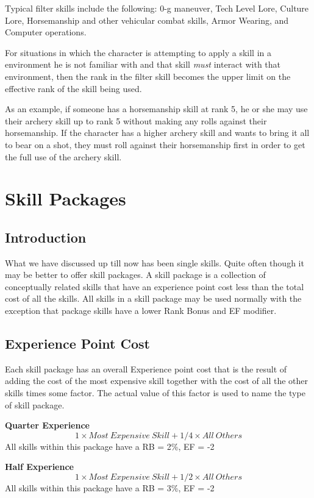 Typical filter skills include the following: 0-g maneuver, Tech 
Level Lore, Culture Lore, Horsemanship and other vehicular combat 
skills, Armor Wearing, and Computer operations.

For situations in which the character is attempting to apply a skill 
in a environment he is not familiar with and that skill {\em must }
interact with that environment, then the rank in the filter skill 
becomes the upper limit on the effective rank of the skill being 
used.

As an example, if someone has a horsemanship skill at rank 5, he or she
may use their archery skill up to rank 5 without making any rolls
against their horsemanship. If the character has a higher archery skill
and wants to bring it all to bear on a shot, they must roll against
their horsemanship first in order to get the full use of the archery
skill.
 
\chapter{Skill Packages}

\section{Introduction}

What we have discussed up till now has been single skills.
Quite often though it may be better to offer skill packages.
A skill package is a collection of conceptually related 
skills that have an experience point cost less than the total 
cost of all the skills. All skills in a skill package may be 
used normally with the exception that package skills have a lower
Rank Bonus and EF modifier.

\section{Experience Point Cost}

Each skill package has an overall Experience point cost that is
the result of adding the cost of the most expensive skill together
with the cost of all the other skills times some factor. The actual value
of this factor is used to name the type of skill package.


{\bf Quarter Experience}
\[ 1 \times Most\ Expensive\ Skill + 1/4 \times All\ Others \]
All skills within this package have a RB = 2\%, EF = -2 

{\bf Half Experience }
\[ 1 \times Most\ Expensive\ Skill + 1/2 \times All\ Others \]
All skills within this package have a RB = 3\%, EF = -2

